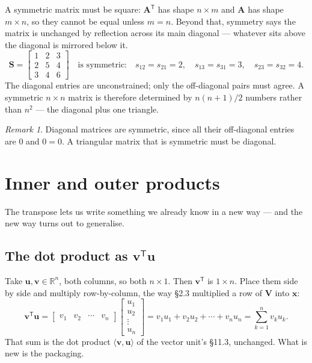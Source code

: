 \documentclass[11pt]{article}
\theoremstyle{plain}
\theoremstyle{definition}
\theoremstyle{remark}
\newtheorem*{rmk}{Remark}
\newcommand{\R}{\mathbb{R}}
\newcommand{\vc}[1]{\mathbf{#1}}        %
\newcommand{\mt}[1]{\mathbf{#1}}        %
\newcommand{\T}{^{\mathsf{T}}}          %
\begin{document}
\noindent A symmetric matrix must be square: $\mt{A}\T$ has shape $n\times m$
and $\mt{A}$ has shape $m\times n$, so they cannot be equal unless $m=n$.
Beyond that, symmetry says the matrix is unchanged by reflection across its
main diagonal --- whatever sits above the diagonal is mirrored below it.
\[
  \mt{S}=\begin{bmatrix}1&2&3\\2&5&4\\3&4&6\end{bmatrix}
  \quad\text{is symmetric:}\quad
  s_{12}=s_{21}=2,\quad s_{13}=s_{31}=3,\quad s_{23}=s_{32}=4 .
\]
The diagonal entries are unconstrained; only the off-diagonal pairs must agree.
A symmetric $n\times n$ matrix is therefore determined by
$n(n+1)/2$ numbers rather than $n^{2}$ --- the diagonal plus one triangle.

\begin{rmk}
Diagonal matrices are symmetric, since all their off-diagonal entries are $0$
and $0=0$. A triangular matrix that is symmetric must be diagonal.
\end{rmk}

\section{Inner and outer products}
The transpose lets us write something we already know in a new way --- and the
new way turns out to generalise.

\subsection{The dot product as \texorpdfstring{$\vc{v}\T\vc{u}$}{v'u}}
Take $\vc{u},\vc{v}\in\R^{n}$, both columns, so both $n\times1$. Then $\vc{v}\T$
is $1\times n$. Place them side by side and multiply row-by-column, the way
\S2.3 multiplied a row of $\mt{V}$ into $\vc{x}$:
\[
  \vc{v}\T\vc{u}
  =\begin{bmatrix}v_1&v_2&\cdots&v_n\end{bmatrix}
   \begin{bmatrix}u_1\\u_2\\\vdots\\u_n\end{bmatrix}
  = v_1u_1+v_2u_2+\cdots+v_nu_n
  = \sum_{k=1}^{n} v_ku_k .
\]
That sum is the dot product $\langle\vc{v},\vc{u}\rangle$ of the vector unit's
\S11.3, unchanged. What is new is the packaging.
\end{document}
